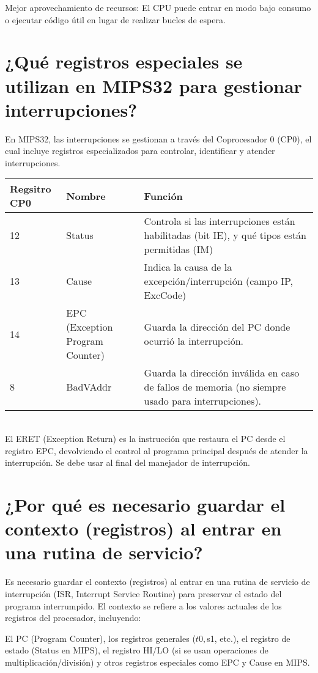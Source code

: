 \documentclass[]{article}
\begin{document}
 Mejor aprovechamiento de recursos:
El CPU puede entrar en modo bajo consumo o ejecutar código útil en lugar de realizar bucles de espera.

\section{¿Qué registros especiales se utilizan en MIPS32 para gestionar interrupciones?}

En MIPS32, las interrupciones se gestionan a través del Coprocesador 0 (CP0), el cual incluye registros especializados para controlar, identificar y atender interrupciones. \\

\begin{tabular}{|p{2.5cm}|p{4cm}|p{4cm}|}
	\hline
	Regsitro CP0 & Nombre & Función  \\
	\hline
	12 & Status & Controla si las interrupciones están habilitadas (bit IE), y qué tipos están permitidas (IM) \\
	\hline
	13 & Cause & Indica la causa de la excepción/interrupción (campo IP, ExcCode)  \\
	\hline
	14 & EPC (Exception Program Counter) & Guarda la dirección del PC donde ocurrió la interrupción.  \\
	\hline
	8 & BadVAddr & Guarda la dirección inválida en caso de fallos de memoria (no siempre usado para interrupciones).  \\
	\hline
\end{tabular} \\

 
 El ERET (Exception Return) es la instrucción que restaura el PC desde el registro EPC, devolviendo el control al programa principal después de atender la interrupción. Se debe usar al final del manejador de interrupción.

\section{¿Por qué es necesario guardar el contexto (registros) al entrar en una rutina de servicio?}

Es necesario guardar el contexto (registros) al entrar en una rutina de servicio de interrupción (ISR, Interrupt Service Routine) para preservar el estado del programa interrumpido. El contexto se refiere a los valores actuales de los registros del procesador, incluyendo:

El PC (Program Counter), los registros generales ($t0, $s1, etc.), el registro de estado (Status en MIPS), el registro HI/LO (si se usan operaciones de multiplicación/división) y otros registros especiales como EPC y Cause en MIPS. \\
\end{document}
